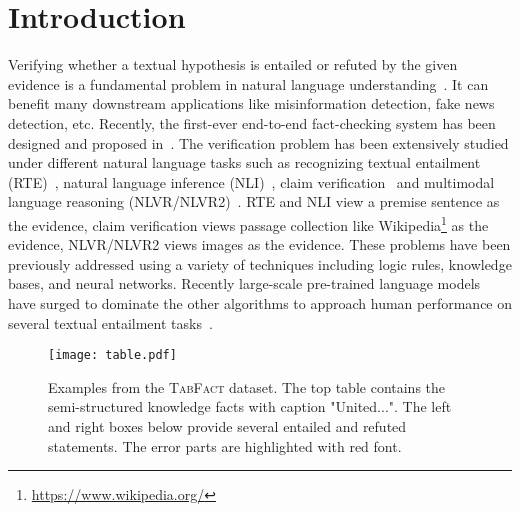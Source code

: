 \documentclass{article} \usepackage{iclr2020_conference,times}
\begin{document}
\section{Introduction}
Verifying whether a textual hypothesis is entailed or refuted by the given evidence is a fundamental problem in natural language understanding~\citep{katz1963structure,van2008brief}. It can benefit many downstream applications like misinformation detection, fake news detection, etc. Recently, the first-ever end-to-end fact-checking system has been designed and proposed in~\cite{hassan2017claimbuster}. The verification problem has been extensively studied under different natural language tasks such as recognizing textual entailment (RTE)~\citep{dagan2005pascal}, natural language inference (NLI)~\citep{bowman2015large}, claim verification~\citep{popat2017truth,hanselowski2018ukp,thorne2018fever} and multimodal language reasoning (NLVR/NLVR2)~\citep{suhr2017corpus,suhr2019corpus}. RTE and NLI view a premise sentence as the evidence, claim verification views passage collection like Wikipedia\footnote{\url{https://www.wikipedia.org/}} as the evidence, NLVR/NLVR2 views images as the evidence. These problems have been previously addressed using a variety of techniques including logic rules, knowledge bases, and neural networks. Recently large-scale pre-trained language models~\citep{devlin2018bert,peters2018deep,yang2019xlnet,liu2019roberta} have surged to dominate the other algorithms to approach human performance on several textual entailment tasks~\citep{wang2018glue,wang2019superglue}. 
\begin{figure}
    \centering
    \texttt{[image: table.pdf]}
    \vspace{-2ex}
    \caption{Examples from the \textsc{TabFact} dataset. The top table contains the semi-structured knowledge facts with caption "United...". The left and right boxes below provide several entailed and refuted statements. The error parts are highlighted with red font.}
    \vspace{-3ex}
    \label{fig:table}
\end{figure}
\end{document}
